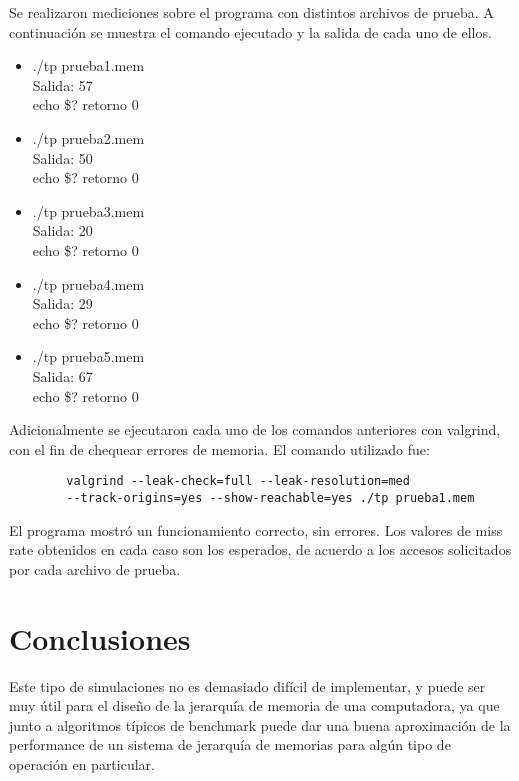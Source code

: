 \documentclass[a4paper,10pt]{article}
\begin{document}
    Se realizaron mediciones sobre el programa con distintos archivos de prueba. A continuación se muestra el comando ejecutado y la salida de cada uno de ellos.
    \begin{itemize}
        \item ./tp prueba1.mem\\
        Salida: 57\\
        echo \$? retorno 0\\
        \item ./tp prueba2.mem\\
        Salida: 50\\
        echo \$? retorno 0\\
        \item ./tp prueba3.mem\\
        Salida: 20\\
        echo \$? retorno 0\\
        \item ./tp prueba4.mem\\
        Salida: 29\\
        echo \$? retorno 0\\
        \item ./tp prueba5.mem\\
        Salida: 67\\
        echo \$? retorno 0\\
    \end{itemize}
    
    Adicionalmente se ejecutaron cada uno de los comandos anteriores con valgrind, con el fin de chequear errores de memoria. El comando utilizado fue:
    \begin{verbatim}
        valgrind --leak-check=full --leak-resolution=med 
        --track-origins=yes --show-reachable=yes ./tp prueba1.mem
    \end{verbatim}
    
    El programa mostró un funcionamiento correcto, sin errores. Los valores de miss rate obtenidos en cada caso son los esperados, de acuerdo a los accesos solicitados por cada archivo de prueba.\\
    
\section{Conclusiones}
   Este tipo de simulaciones no es demasiado difícil de implementar, y puede ser muy útil para el diseño de la jerarquía de memoria de una computadora, ya que junto a algoritmos típicos de benchmark puede dar una buena aproximación de la performance de un sistema de jerarquía de memorias para algún tipo de operación en particular.\\
   
\end{document}
